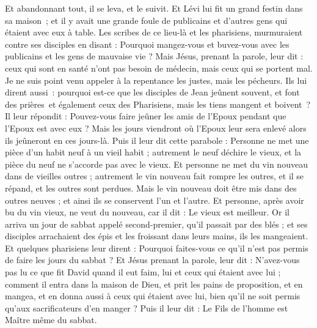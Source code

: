 \begin{multicols}{2}
Et abandonnant tout, il se leva, et le suivit.
Et Lévi lui fit un grand festin dans sa maison ; et il y avait une grande foule de publicains et d’autres gens qui étaient avec eux à table.
Les scribes de ce lieu-là et les pharisiens, murmuraient contre ses disciples en disant : Pourquoi mangez-vous et buvez-vous avec les publicains et les gens de mauvaise vie ?
Mais Jésus, prenant la parole, leur dit : ceux qui sont en santé n’ont pas besoin de médecin, mais ceux qui se portent mal.
Je ne suis point venu appeler à la repentance les justes, mais les pécheurs.
Ils lui dirent aussi : pourquoi est-ce que les disciples de Jean jeûnent souvent, et font des prières et également ceux des Pharisiens, mais les tiens mangent et boivent ?
Il leur répondit : Pouvez-vous faire jeûner les amis de l'Epoux pendant que l'Epoux est avec eux ?
Mais les jours viendront où l'Epoux leur sera enlevé alors ils jeûneront en ces jours-là.
Puis il leur dit cette parabole : Personne ne met une pièce d'un habit neuf à un vieil habit ; autrement le neuf déchire le vieux, et la pièce du neuf ne s'accorde pas avec le vieux.
Et personne ne met du vin nouveau dans de vieilles outres ; autrement le vin nouveau fait rompre les outres, et il se répand, et les outres sont perdues.
Mais le vin nouveau doit être mis dans des outres neuves ; et ainsi ils se conservent l'un et l'autre.
Et personne, après avoir bu du vin vieux, ne veut du nouveau, car il dit : Le vieux est meilleur.
\VerseOne{}Or il arriva un jour de sabbat appelé second-premier, qu'il passait par des blés ; et ses disciples arrachaient des épis et les froissant dans leurs mains, ils les mangeaient.
Et quelques pharisiens leur dirent : Pourquoi faites-vous ce qu'il n'est pas permis de faire les jours du sabbat ?
Et Jésus prenant la parole, leur dit : N'avez-vous pas lu ce que fit David quand il eut faim, lui et ceux qui étaient avec lui ;
comment il entra dans la maison de Dieu, et prit les pains de proposition, et en mangea, et en donna aussi à ceux qui étaient avec lui, bien qu'il ne soit permis qu'aux sacrificateurs d'en manger ?
Puis il leur dit : Le Fils de l'homme est Maître même du sabbat.

\end{multicols}
